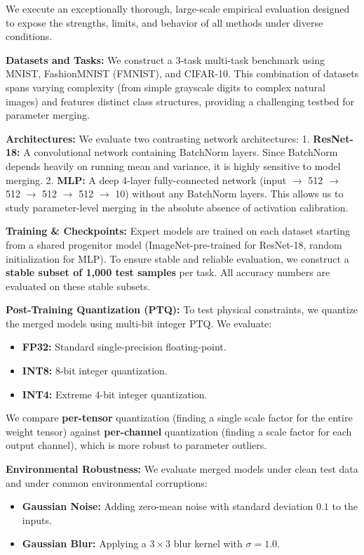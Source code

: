 \documentclass{article}
\theoremstyle{plain}
\theoremstyle{definition}
\theoremstyle{remark}
\begin{document}
We execute an exceptionally thorough, large-scale empirical evaluation designed to expose the strengths, limits, and behavior of all methods under diverse conditions.

\textbf{Datasets and Tasks:} We construct a 3-task multi-task benchmark using MNIST, FashionMNIST (FMNIST), and CIFAR-10. This combination of datasets spans varying complexity (from simple grayscale digits to complex natural images) and features distinct class structures, providing a challenging testbed for parameter merging.

\textbf{Architectures:} We evaluate two contrasting network architectures:
1. \textbf{ResNet-18:} A convolutional network containing BatchNorm layers. Since BatchNorm depends heavily on running mean and variance, it is highly sensitive to model merging.
2. \textbf{MLP:} A deep 4-layer fully-connected network (input $\to$ 512 $\to$ 512 $\to$ 512 $\to$ 512 $\to$ 10) without any BatchNorm layers. This allows us to study parameter-level merging in the absolute absence of activation calibration.

\textbf{Training \& Checkpoints:} Expert models are trained on each dataset starting from a shared progenitor model (ImageNet-pre-trained for ResNet-18, random initialization for MLP). To ensure stable and reliable evaluation, we construct a \textbf{stable subset of 1,000 test samples} per task. All accuracy numbers are evaluated on these stable subsets.

\textbf{Post-Training Quantization (PTQ):} To test physical constraints, we quantize the merged models using multi-bit integer PTQ. We evaluate:
\begin{itemize}
  \item \textbf{FP32:} Standard single-precision floating-point.
  \item \textbf{INT8:} 8-bit integer quantization.
  \item \textbf{INT4:} Extreme 4-bit integer quantization.
\end{itemize}
We compare \textbf{per-tensor} quantization (finding a single scale factor for the entire weight tensor) against \textbf{per-channel} quantization (finding a scale factor for each output channel), which is more robust to parameter outliers.

\textbf{Environmental Robustness:} We evaluate merged models under clean test data and under common environmental corruptions:
\begin{itemize}
  \item \textbf{Gaussian Noise:} Adding zero-mean noise with standard deviation $0.1$ to the inputs.
  \item \textbf{Gaussian Blur:} Applying a $3 \times 3$ blur kernel with $\sigma=1.0$.
\end{itemize}
\end{document}
